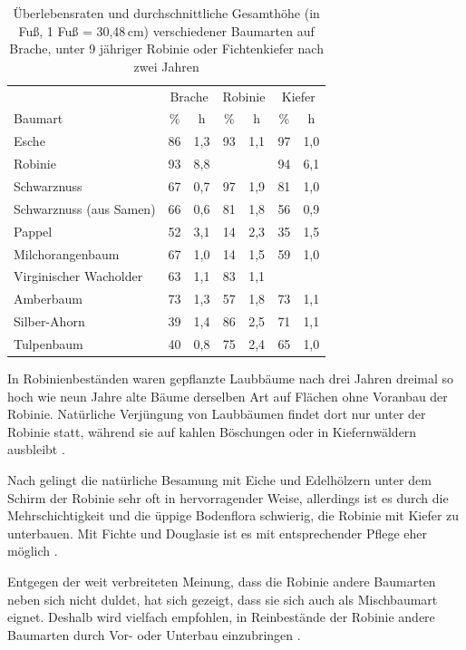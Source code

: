 \documentclass[twocolumn]{scrartcl}
\begin{document}
\begin{table}[htbp]
\centering
\begin{tabular}{lcc|cc|cc}
   & \multicolumn{2}{c}{Brache} & \multicolumn{2}{c}{Robinie} & \multicolumn{2}{c}{Kiefer} \\
  Baumart & \% & h & \% & h & \% & h \\
  \hline
Esche                    & 86 & 1,3 & 93 & 1,1 & 97 & 1,0 \\
Robinie                  & 93 & 8,8 &  &  & 94 & 6,1 \\
Schwarznuss              & 67 & 0,7 & 97 & 1,9 & 81 & 1,0 \\
Schwarznuss (aus Samen)  & 66 & 0,6 & 81 & 1,8 & 56 & 0,9 \\
Pappel                   & 52 & 3,1 & 14 & 2,3 & 35 & 1,5 \\
Milchorangenbaum         & 67 & 1,0 & 14 & 1,5 & 59 & 1,0 \\
Virginischer Wacholder   & 63 & 1,1 & 83 & 1,1 &  &  \\
Amberbaum                & 73 & 1,3 & 57 & 1,8 & 73 & 1,1 \\
Silber-Ahorn             & 39 & 1,4 & 86 & 2,5 & 71 & 1,1 \\
Tulpenbaum               & 40 & 0,8 & 75 & 2,4 & 65 & 1,0 \\
\end{tabular}
\caption{Überlebensraten und durchschnittliche Gesamthöhe (in Fuß, 1 Fuß = 30,48\,cm) verschiedener Baumarten auf Brache, unter 9 jähriger Robinie oder Fichtenkiefer nach zwei Jahren \citep{limstrom1951schuttaufforstung}}
  \label{tab:zuwachsUnterbau3}
\end{table}

In Robinienbeständen waren gepflanzte Laubbäume nach drei Jahren
dreimal so hoch wie neun Jahre alte Bäume derselben Art auf Flächen
ohne Voranbau der Robinie. Natürliche Verjüngung von Laubbäumen findet
dort nur unter der Robinie statt, während sie auf kahlen Böschungen
oder in Kiefernwäldern ausbleibt \citep{chapman1947robinie}.

Nach \citet[S.~19]{erteld1952robinieErtrag} gelingt die natürliche
Besamung mit Eiche und Edelhölzern unter dem Schirm der Robinie sehr
oft in hervorragender Weise, allerdings ist es durch die
Mehrschichtigkeit und die üppige Bodenflora schwierig, die Robinie mit
Kiefer zu unterbauen. Mit Fichte und Douglasie ist es mit
entsprechender Pflege eher möglich
\citep[S.~94]{erteld1952robinieErtrag}.

Entgegen der weit verbreiteten Meinung, dass die Robinie andere
Baumarten neben sich nicht duldet, hat sich gezeigt, dass sie sich
auch als Mischbaumart eignet. Deshalb wird vielfach empfohlen, in
Reinbestände der Robinie andere Baumarten durch Vor- oder Unterbau
einzubringen \citep{ewald2001klone}.
\end{document}
